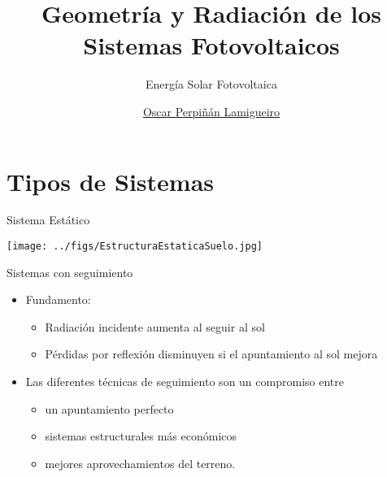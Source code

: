 \documentclass[aspectratio=169, usenames,svgnames,dvipsnames]{beamer}
\author{\href{https://oscarperpinan.github.io}{Oscar Perpiñán Lamigueiro}}
\date{}
\title{Geometría y Radiación de los Sistemas Fotovoltaicos}
\subtitle{Energía Solar Fotovoltaica}
\institute[UPM]{Universidad Politécnica de Madrid}
\begin{document}
\maketitle

\section{Tipos de Sistemas}
\label{sec:org3517236}
\begin{frame}[label={sec:orgdd80a58}]{Sistema Estático}
\begin{center}
\texttt{[image: ../figs/EstructuraEstaticaSuelo.jpg]}
\end{center}
\end{frame}

\begin{frame}[label={sec:orgffee32e}]{Sistemas con seguimiento}
\begin{itemize}
\item \alert{Fundamento:}
\begin{itemize}
\item Radiación incidente aumenta al seguir al sol

\item Pérdidas por reflexión disminuyen si el apuntamiento al sol mejora
\end{itemize}

\item Las diferentes técnicas de seguimiento son un \alert{compromiso} entre

\begin{itemize}
\item un \alert{apuntamiento perfecto}

\item \alert{sistemas estructurales más económicos}

\item mejores \alert{aprovechamientos del terreno}.
\end{itemize}
\end{itemize}
\end{frame}
\end{document}
